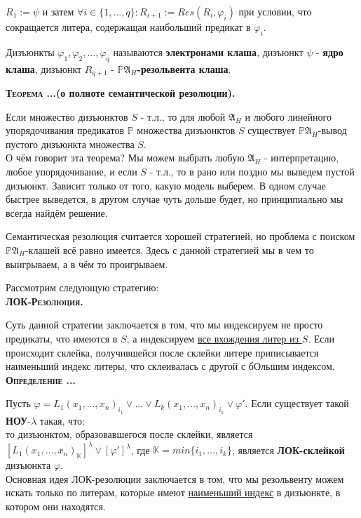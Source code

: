 \documentclass[18pt, a4paper]{extarticle}
\newcounter{par}
\newcounter{spar}
\newcounter{zap}
\newcommand{\opr}{\textbf{\textsc{Определение \thepar.\if\thespar1\thespar.\fi\thezap.\;}}\stepcounter{zap}}
\newcommand{\teorT}[1]{\textbf{\textsc{Теорема \thepar.\if\thespar1\thespar.\fi\thezap.}(#1).}\stepcounter{zap}}
\newcommand{\bftex}[1]{\textbf{\textsc{#1}.}}
\newcommand{\centr}[1]{\makebox[\linewidth]{#1}}
\newcommand{\mA}{\mathfrak{A}}
\newcommand{\vp}{\varphi}
\newcommand{\res}[2]{Res(#1,#2)}
\newcommand{\lot}[3]{#1_#2,\dots,#1_#3}
\begin{document}
$R_1:=\psi$ и затем $\forall i\in\{1,\dots,q\}\!\!:R_{i+1}:=\res {R_i} {\vp_i}$ при условии, что сокращается литера, содержащая наибольший предикат в $\vp_i$.

Дизъюнкты $\vp_1,\lot \vp 2 q$ называются \textbf{электронами клаша}, дизъюнкт $\psi$ - \textbf{ядро клаша}, дизъюнкт $R_{q+1}$ - \textbf{$\mathbb P\mA_H$-резольвента клаша}.

\teorT{о полноте семантической резолюции}

Если множество дизъюнктов $S$ - т.л., то для любой $\mA_H$ и любого линейного упорядочивания предикатов $\mathbb P$ множества дизъюнктов $S$ существует $\mathbb P\mA_H$-вывод пустого дизъюнкта множества $S$.\\

О чём говорит эта теорема? Мы можем выбрать любую $\mA_H$ - интерпретацию, любое упорядочивание, и если $S$ - т.л., то в рано или поздно мы выведем пустой дизъюнкт. Зависит только от того, какую модель выберем. В одном случае быстрее выведется, в другом случае чуть дольше будет, но принципиально мы всегда найдём решение.

Семантическая резолюция считается хорошей стратегией, но проблема с поиском $\mathbb P\mA_H$-клашей всё равно имеется. Здесь с данной стратегией мы в чем то выигрываем, а в чём то проигрываем.

Рассмотрим следующую стратегию:\\

\bftex{ЛОК-Резолюция}

Суть данной стратегии заключается в том, что мы индексируем не просто предикаты, что имеются в $S$, а индексируем \underline{все вхождения литер из $S$}. Если происходит склейка, получившейся после склейки литере приписывается наименьший индекс литеры, что склеивалась с другой с бОльшим индексом.\\

\opr 

Пусть $\vp=L_1(\lot x 1 n)_{i_1}\vee\dots\vee L_k(\lot x 1 n)_{i_k}\vee\vp'$. Если существует такой \textbf{НОУ}-$\lambda$ такая, что:
\\\centr{$[L_1(\lot x 1 n)_{i_1}]^\lambda=\dots=[L_k(\lot x 1 n)_{i_k}]^\lambda$,}
то дизъюнктом, образовавшегося после склейки, является \\$[L_1(\lot x 1 n)_{\mathbb K}]^\lambda\vee[\vp']^\lambda$, где $\mathbb K=min\{\lot i 1 k\}$, является \textbf{ЛОК-склейкой} дизъюнкта $\vp$.\\

Основная идея ЛОК-резолюции заключается в том, что мы резольвенту можем искать только по литерам, которые имеют \underline{наименьший индекс} в дизъюнкте, в котором они находятся.\\
\end{document}
